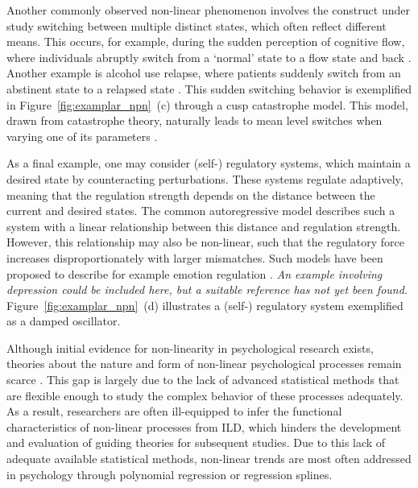 \documentclass[man, floatsintext]{apa7}
\begin{document}
Another commonly observed non-linear phenomenon involves the construct under
study switching between multiple distinct states, which often reflect different
means. This occurs, for example, during the sudden perception of cognitive
flow, where individuals abruptly switch from a `normal' state to a flow state
and back \parencite{ceja_suddenly_2012}. Another example is alcohol use
relapse, where patients suddenly switch from an abstinent state to a relapsed
state \parencite{witkiewitz_modeling_2007}. This sudden switching behavior is
exemplified in Figure~\ref{fig:examplar_npn}~(c)
through a cusp catastrophe model. This model, drawn from catastrophe
theory, naturally leads to mean level switches when varying one of its
parameters \parencite{van_der_maas_sudden_2003,chow_cusp_2015}.

As a final example, one may consider (self-) regulatory systems, which maintain
a desired state by counteracting perturbations. These systems regulate
adaptively, meaning that the regulation strength depends on the distance
between the
current and desired states. The common autoregressive model describes such a
system with a linear relationship between this distance and regulation
strength. However, this relationship may also be non-linear, such that the
regulatory force increases disproportionately with larger mismatches. Such
models have been proposed to describe for example emotion regulation
\parencite{chow_emotion_2005}. \textit{An example involving depression could be
  included here, but a suitable reference has not yet been found.}
Figure~\ref{fig:examplar_npn}~(d) illustrates a
(self-) regulatory system exemplified as a damped oscillator.

Although initial evidence for non-linearity in psychological research exists,
theories about the nature and form of non-linear psychological processes remain
scarce \parencite{tan_time-varying_2011}. This gap is largely due to the lack
of advanced statistical methods that are flexible enough to study the complex
behavior of these processes adequately. As a result, researchers are often
ill-equipped to infer the functional characteristics of non-linear processes
from ILD, which hinders the development and evaluation of guiding theories for
subsequent studies. Due to this lack of adequate available statistical methods,
non-linear trends are most often addressed in psychology through polynomial
regression or regression splines.
\end{document}

